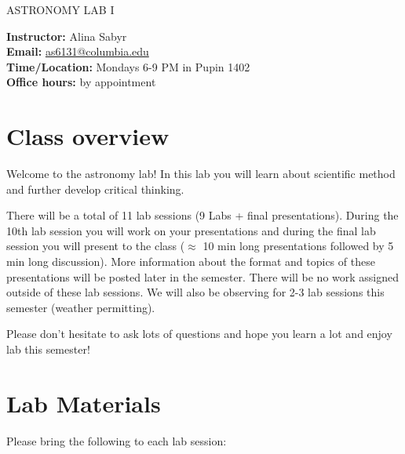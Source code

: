 \documentclass[12pt]{article}
\begin{document}
 
\begin{center}
{\huge ASTRONOMY LAB I}\\

\end{center}
 
\bigskip
 
 
\noindent \textbf{\normalsize Instructor:} {\normalsize Alina Sabyr} \\ 
\textbf{\normalsize Email:} {\normalsize \url{as6131@columbia.edu}}\\
 
 
\noindent \textbf{\normalsize Time/Location:} {\normalsize Mondays 6-9 PM in Pupin 1402} \\
\textbf{\normalsize Office hours:} {\normalsize by appointment}
 
 
 
\section*{Class overview}
 
Welcome to the astronomy lab! In this lab you will learn about scientific method and further develop critical thinking. 
 
There will be a total of 11 lab sessions (9 Labs + final presentations). During the 10th lab session you will work on your presentations and during the final lab session you will present to the class ($\approx$ 10 min long presentations followed by 5 min long discussion). More information about the format and topics of these presentations will be posted later in the semester. There will be no work assigned outside of these lab sessions. We will also be observing for 2-3 lab sessions this semester (weather permitting). 

Please don't hesitate to ask lots of questions and hope you learn a lot and enjoy lab this semester!
 
\section*{Lab Materials}
 
Please bring the following to each lab session:
 
\end{document}
